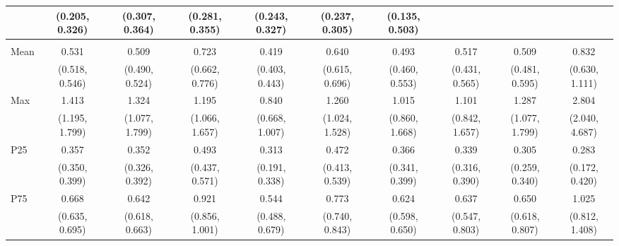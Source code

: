 {\begin{tabular}{l|c|c|c|c|c|c|c|c|c}
& {\scriptsize (0.205, 0.326)}
& {\scriptsize (0.307, 0.364)}
& {\scriptsize (0.281, 0.355)}
& {\scriptsize (0.243, 0.327)}
& {\scriptsize (0.237, 0.305)}
& {\scriptsize (0.135, 0.503)}
\\ [0.1cm]
\hline
\noalign{\smallskip}
\multicolumn{10}{l}{\textbf{Effect with Leads and Lags}} \\
\noalign{\smallskip}
\hline
Mean
& 0.531 & 0.509 & 0.723 & 0.419 & 0.640 & 0.493 & 0.517 & 0.509 & 0.832 \\
& {\scriptsize (0.518, 0.546)}
& {\scriptsize (0.490, 0.524)}
& {\scriptsize (0.662, 0.776)}
& {\scriptsize (0.403, 0.443)}
& {\scriptsize (0.615, 0.696)}
& {\scriptsize (0.460, 0.553)}
& {\scriptsize (0.431, 0.565)}
& {\scriptsize (0.481, 0.595)}
& {\scriptsize (0.630, 1.111)}
\\ [0.1cm]
\hline
Max
& 1.413 & 1.324 & 1.195 & 0.840 & 1.260 & 1.015 & 1.101 & 1.287 & 2.804 \\
& {\scriptsize (1.195, 1.799)}
& {\scriptsize (1.077, 1.799)}
& {\scriptsize (1.066, 1.657)}
& {\scriptsize (0.668, 1.007)}
& {\scriptsize (1.024, 1.528)}
& {\scriptsize (0.860, 1.668)}
& {\scriptsize (0.842, 1.657)}
& {\scriptsize (1.077, 1.799)}
& {\scriptsize (2.040, 4.687)}
\\ [0.1cm]
\hline
P25
& 0.357 & 0.352 & 0.493 & 0.313 & 0.472 & 0.366 & 0.339 & 0.305 & 0.283 \\
& {\scriptsize (0.350, 0.399)}
& {\scriptsize (0.326, 0.392)}
& {\scriptsize (0.437, 0.571)}
& {\scriptsize (0.191, 0.338)}
& {\scriptsize (0.413, 0.539)}
& {\scriptsize (0.341, 0.399)}
& {\scriptsize (0.316, 0.390)}
& {\scriptsize (0.259, 0.340)}
& {\scriptsize (0.172, 0.420)}
\\ [0.1cm]
\hline
P75
& 0.668 & 0.642 & 0.921 & 0.544 & 0.773 & 0.624 & 0.637 & 0.650 & 1.025 \\
& {\scriptsize (0.635, 0.695)}
& {\scriptsize (0.618, 0.663)}
& {\scriptsize (0.856, 1.001)}
& {\scriptsize (0.488, 0.679)}
& {\scriptsize (0.740, 0.843)}
& {\scriptsize (0.598, 0.650)}
& {\scriptsize (0.547, 0.803)}
& {\scriptsize (0.618, 0.807)}
& {\scriptsize (0.812, 1.408)}
\\ [0.1cm]
\hline
\hline
\end{tabular}
}

